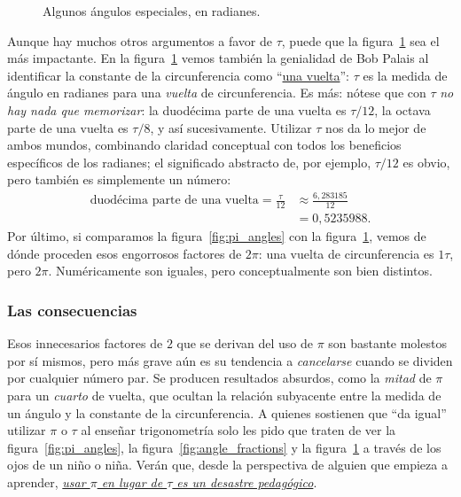 \begin{figure}
\begin{center}
\end{center}
\caption{Algunos ángulos especiales, en radianes.\label{fig:tau_angles}}
\end{figure}

Aunque hay muchos otros argumentos a favor de $\tau$, puede que la figura~\ref{fig:tau_angles} sea el más impactante. En la figura~\ref{fig:tau_angles} vemos también la genialidad de Bob Palais al identificar la constante de la circunferencia como ``\href{https://es.wikipedia.org/wiki/Vuelta_(%C3%A1ngulo)}{una vuelta}'': $\tau$ es la medida de ángulo en radianes para una \emph{vuelta} de circunferencia. Es más: nótese que con $\tau$ \emph{no hay nada que memorizar}: la duodécima parte de una vuelta es $\tau/12$, la octava parte de una vuelta es $\tau/8$, y así sucesivamente. Utilizar $\tau$ nos da lo mejor de ambos mundos, combinando claridad conceptual con todos los beneficios específicos de los radianes; el significado abstracto de, por ejemplo, $\tau/12$ es obvio, pero también es simplemente un número:
\[
\begin{split}
\mbox{duodécima parte de una vuelta} = \frac{\tau}{12} & \approx \frac{6{,}283185}{12} \\
                                                       & = 0{,}5235988.
\end{split}
\]
Por último, si comparamos la figura~\ref{fig:pi_angles} con la figura~\ref{fig:tau_angles}, vemos de dónde proceden esos engorrosos factores de $2\pi$: una vuelta de circunferencia es $1\tau$, pero $2\pi$. Numéricamente son iguales, pero conceptualmente son bien distintos.

    \subsubsection{Las consecuencias} %
    \label{sec:the_ramifications}

Esos innecesarios factores de $2$ que se derivan del uso de $\pi$ son bastante molestos por sí mismos, pero más grave aún es su tendencia a \emph{cancelarse} cuando se dividen por cualquier número par. Se producen resultados absurdos, como la  \emph{mitad} de $\pi$ para un \emph{cuarto} de vuelta, que ocultan la relación subyacente entre la medida de un ángulo y la constante de la circunferencia. A quienes sostienen que ``da igual'' utilizar $\pi$ o $\tau$ al enseñar trigonometría solo les pido que traten de ver la figura~\ref{fig:pi_angles}, la figura~\ref{fig:angle_fractions} y la figura~\ref{fig:tau_angles} a través de los ojos de un niño o niña. Verán que, desde la perspectiva de alguien que empieza a aprender, \href{http://tauday.com/a-tau-testimonial}{\emph{usar $\pi$ en lugar de $\tau$ es un desastre pedagógico}}.

